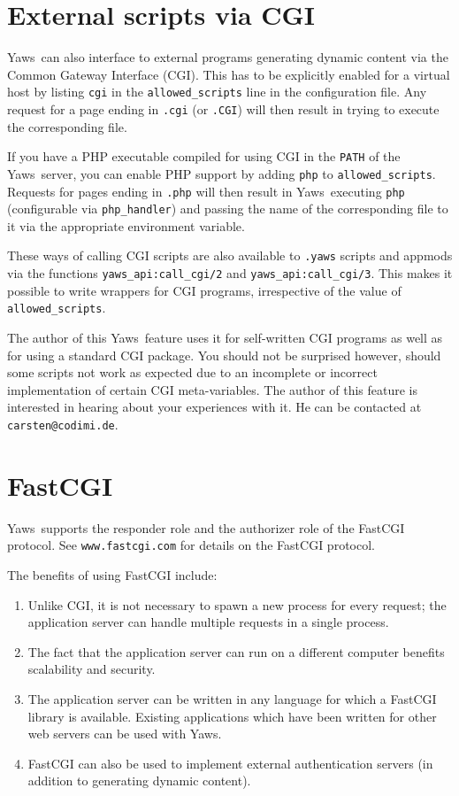 \documentclass[11pt,oneside,english]{book}
\newcommand{\Yaws}            %
        {{\sc Yaws}}
\begin{document}
\chapter{External scripts via CGI}

\Yaws\  can also interface to external programs generating dynamic
content via the Common Gateway Interface (CGI).  This has to be
explicitly enabled for a virtual host by listing \verb+cgi+ in the
\verb+allowed_scripts+ line in the configuration file.  Any request
for a page ending in \verb+.cgi+ (or \verb+.CGI+) will then result in
trying to execute the corresponding file.

If you have a PHP executable compiled for using CGI in the \verb+PATH+
of the \Yaws\  server, you can enable PHP support by adding \verb+php+ to
\verb+allowed_scripts+.  Requests for pages ending in \verb+.php+ will
then result in \Yaws\  executing \verb+php+ (configurable via
\verb+php_handler+) and passing the name of the corresponding file to
it via the appropriate environment variable.

These ways of calling CGI scripts are also available to \verb+.yaws+
scripts and appmods via the functions \verb+yaws_api:call_cgi/2+ and
\verb+yaws_api:call_cgi/3+.  This makes it possible to write wrappers
for CGI programs, irrespective of the value of \verb+allowed_scripts+.

The author of this \Yaws\  feature uses it for self-written CGI programs
as well as for using a standard CGI package.  You should not be
surprised however, should some scripts not work as expected due to an
incomplete or incorrect implementation of certain CGI meta-variables.
The author of this feature is interested in hearing about your
experiences with it.  He can be contacted at \verb+carsten@codimi.de+.

\chapter{FastCGI}

\Yaws\  supports the responder role and the authorizer role of the
FastCGI protocol. See \verb+www.fastcgi.com+ for details on the
FastCGI protocol.

The benefits of using FastCGI include:
\begin{enumerate}
\item Unlike CGI, it is not necessary to spawn a new process for
every request; the application server can handle multiple requests
in a single process.
\item The fact that the application server can run on a different
computer benefits scalability and security.
\item The application server can be written in any language for
which a FastCGI library is available. Existing applications
which have been written for other web servers can be used with
\Yaws{}.
\item FastCGI can also be used to implement external authentication
servers (in addition to generating dynamic content).
\end{enumerate}
\end{document}
